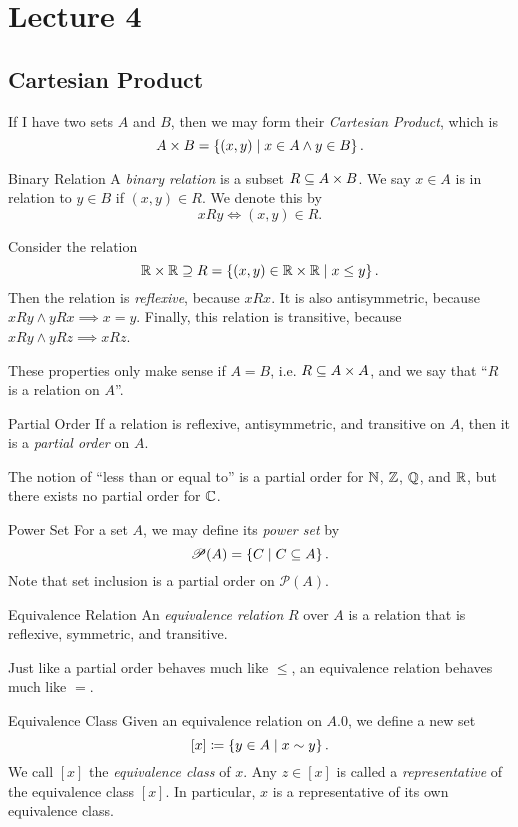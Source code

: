 \documentclass[class=article, crop=false]{standalone}
\begin{document}
  \section{Lecture 4}
  \subsection{Cartesian Product}
  If I have two sets $A$ and $B$, then we may form their \emph{Cartesian Product}, which is
  \[
    A\times B = \left\{(x, y)\mid x\in A\land y\in B\right\}.
  \]
  \begin{definition}{Binary Relation}
    A \emph{binary relation} is a subset $R\subseteq A\times B$. We say $x\in A$ is in relation to $y\in B$ if $(x, y)\in R$. We denote this by
    \[
      xRy\iff (x,y)\in R.
    \]
  \end{definition}
  \begin{example}{}
    Consider the relation 
    \[
      \mathbb{R}\times \mathbb{R}\supseteq R = \left\{(x, y)\in \mathbb{R}\times \mathbb{R}\mid x \leq y\right\}.
    \]
    Then the relation is \emph{reflexive}, because $xRx$. It is also antisymmetric, because $xRy\land yRx\implies x = y$. Finally, this relation is transitive, because $xRy\land yRz\implies xRz$.
  \end{example}
  These properties only make sense if $A = B$, i.e. $R\subseteq A\times A$, and we say that ``$R$ is a relation on $A$''.
  \begin{definition}{Partial Order}
    If a relation is reflexive, antisymmetric, and transitive on $A$, then it is a \emph{partial order} on $A$.
  \end{definition}
  The notion of ``less than or equal to'' is a partial order for $\mathbb{N}$, $\mathbb{Z}$, $\mathbb{Q}$, and $\mathbb{R}$, but there exists no partial order for $\mathbb{C}$.
  \begin{definition}{Power Set}
    For a set $A$, we may define its \emph{power set} by
    \[
      \mathscr{P}(A) = \left\{C\mid C\subseteq A\right\}.
    \]
    Note that set inclusion is a partial order on $\mathscr{P}(A)$.
  \end{definition}
  \begin{definition}{Equivalence Relation}
    An \emph{equivalence relation} $R$ over $A$ is a relation that is reflexive, symmetric, and transitive.
  \end{definition}
  \begin{note}{}
    Just like a partial order behaves much like $\leq$, an equivalence relation behaves much like $=$.
  \end{note}
  \begin{definition}{Equivalence Class}
    Given an equivalence relation on $A$.0, we define a new set
    \[
      [x] \coloneqq \left\{y\in A\mid x\sim y\right\}.
    \]
    We call $[x]$ the \emph{equivalence class} of $x$. Any $z\in [x]$ is called a \emph{representative} of the equivalence class $[x]$. In particular, $x$ is a representative of its own equivalence class.
  \end{definition}
\end{document}
